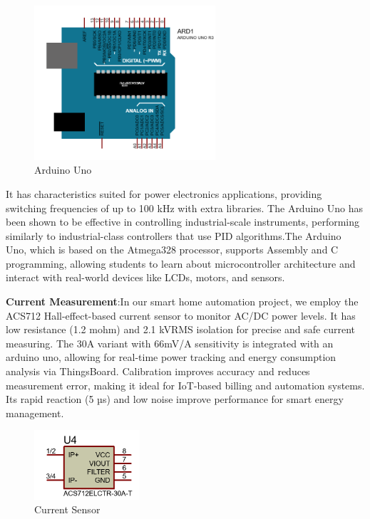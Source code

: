 \documentclass[a4paper,12pt]{report}
\begin{document}
\begin{figure}[H]
    \centering
    \includegraphics[width=0.6\textwidth]{Capture.PNG} %
    \caption{Arduino Uno}
    \label{fig:uno} %

\end{figure}
It has characteristics suited for power electronics applications, providing switching frequencies of up to 100 kHz with extra libraries\cite{muller2015using}.  The Arduino Uno has been shown to be effective in controlling industrial-scale instruments, performing similarly to industrial-class controllers that use PID algorithms\cite{Taufiq_2020}.The Arduino Uno, which is based on the Atmega328 processor, supports Assembly and C programming, allowing students to learn about microcontroller architecture and interact with real-world devices like LCDs, motors, and sensors\cite{Naimi2017TheAM}. 

\textbf{Current Measurement}:In our smart home automation project, we employ the ACS712 Hall-effect-based current sensor to monitor AC/DC power levels. It has low resistance (1.2 mohm) and 2.1 kVRMS isolation for precise and safe current measuring\cite{li2010application}. The 30A variant with 66mV/A sensitivity is integrated with an arduino uno, allowing for real-time power tracking and energy consumption analysis via ThingsBoard.  Calibration improves accuracy and reduces measurement error, making it ideal for IoT-based billing and automation systems.  Its rapid reaction (5 µs) and low noise improve performance for smart energy management\cite{Khair_2017}.
\begin{figure}[H]
    \centering
    \includegraphics[width=0.35\textwidth]{ACS.PNG} %
    \caption{Current Sensor}
\end{figure}
\end{document}
